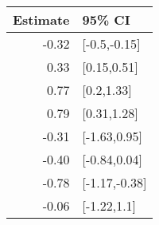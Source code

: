 \begin{tabular}{rl}
  \hline
Estimate & 95\% CI \\ 
  \hline
-0.32 & [-0.5,-0.15] \\ 
  0.33 & [0.15,0.51] \\ 
  0.77 & [0.2,1.33] \\ 
  0.79 & [0.31,1.28] \\ 
  -0.31 & [-1.63,0.95] \\ 
  -0.40 & [-0.84,0.04] \\ 
  -0.78 & [-1.17,-0.38] \\ 
  -0.06 & [-1.22,1.1] \\ 
   \hline
\end{tabular}

